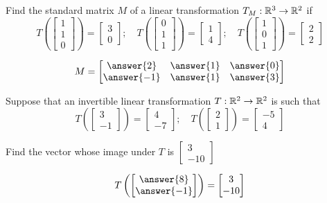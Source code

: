 \documentclass{ximera}
\begin{document}
 \begin{exercise}
Find the standard matrix $M$ of a linear transformation $T_M:\mathbb{R}^3\rightarrow \mathbb{R}^2$ if
$$T\left(\begin{bmatrix}1\\1\\0\end{bmatrix}\right)=\begin{bmatrix}3\\0\end{bmatrix};\quad T\left(\begin{bmatrix}0\\1\\1\end{bmatrix}\right)=\begin{bmatrix}1\\4\end{bmatrix};\quad T\left(\begin{bmatrix}1\\0\\1\end{bmatrix}\right)=\begin{bmatrix}2\\2\end{bmatrix}$$
 
$$M=\begin{bmatrix}\answer{2} & \answer{1} & \answer{0}\\\answer{-1} &\answer{1} & \answer{3}\end{bmatrix}$$
 
 \end{exercise}

 \begin{exercise}
Suppose that an invertible linear transformation $T:\mathbb{R}^2\rightarrow \mathbb{R}^2$ is such that
$$T\left(\begin{bmatrix}3\\-1\end{bmatrix}\right)=\begin{bmatrix}4\\-7\end{bmatrix};\quad T\left(\begin{bmatrix}2\\1\end{bmatrix}\right)=\begin{bmatrix}-5\\4\end{bmatrix}$$
 
Find the vector whose image under $T$ is $\begin{bmatrix}3\\-10\end{bmatrix}$
 
$$T\left(\begin{bmatrix}\answer{8}\\\answer{-1}\end{bmatrix}\right)=\begin{bmatrix}3\\-10\end{bmatrix}$$
 
 \end{exercise}
\end{document}
